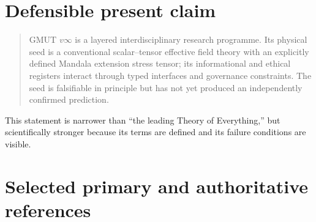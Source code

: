 \documentclass[11pt]{article}
\begin{document}
\section{Defensible present claim}

\begin{quote}
GMUT $v\infty$ is a layered interdisciplinary research programme. Its physical seed is a conventional scalar--tensor effective field theory with an explicitly defined Mandala extension stress tensor; its informational and ethical registers interact through typed interfaces and governance constraints. The seed is falsifiable in principle but has not yet produced an independently confirmed prediction.
\end{quote}

This statement is narrower than ``the leading Theory of Everything,'' but scientifically stronger because its terms are defined and its failure conditions are visible.

\section*{Selected primary and authoritative references}
\end{document}
